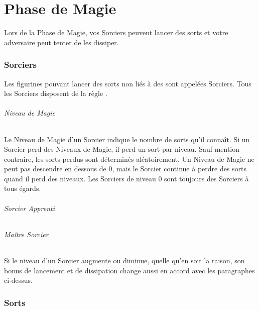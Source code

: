 
\part{Phase de Magie}

Lors de la Phase de Magie, vos Sorciers peuvent lancer des sorts et votre adversaire peut tenter de les dissiper.

\section{Sorciers}

Les figurines pouvant lancer des sorts non liés à des \boundspells{} sont appelées Sorciers. Tous les Sorciers disposent de la règle \channel{}.

\paragraph{Niveau de Magie} 

Le Niveau de Magie d'un Sorcier indique le nombre de sorts qu'il connaît. Si un Sorcier perd des Niveaux de Magie, il perd un sort par niveau. Sauf mention contraire, les sorts perdus sont déterminés aléatoirement. Un Niveau de Magie ne peut pas descendre en dessous de 0, mais le Sorcier continue à perdre des sorts quand il perd des niveaux. Les Sorciers de niveau 0 sont toujours des Sorciers à tous égards.

\paragraph{Sorcier Apprenti} 


\paragraph{Maître Sorcier} 


Si le niveau d'un Sorcier augmente ou diminue, quelle qu'en soit la raison, son bonus de lancement et de dissipation change aussi en accord avec les paragraphes ci-dessus.

\section{Sorts}

